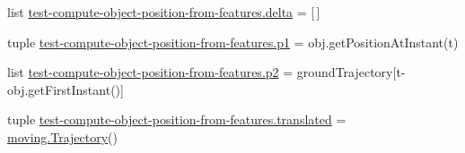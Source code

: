 \begin{DoxyCompactItemize}
\item 
list \hyperlink{namespacetest-compute-object-position-from-features_a9fb99bd15a02836c106926cd0cdb036c}{test-\/compute-\/object-\/position-\/from-\/features.\-delta} = \mbox{[}$\,$\mbox{]}
\item 
tuple \hyperlink{namespacetest-compute-object-position-from-features_a1c5107cbd3fc58e63db55e249d976a61}{test-\/compute-\/object-\/position-\/from-\/features.\-p1} = obj.\-get\-Position\-At\-Instant(t)
\item 
list \hyperlink{namespacetest-compute-object-position-from-features_a762b0d235330d8277506c9bbc52cc900}{test-\/compute-\/object-\/position-\/from-\/features.\-p2} = ground\-Trajectory\mbox{[}t-\/obj.\-get\-First\-Instant()\mbox{]}
\item 
tuple \hyperlink{namespacetest-compute-object-position-from-features_a07c2b413c41f4469dcb2c5e8185db85d}{test-\/compute-\/object-\/position-\/from-\/features.\-translated} = \hyperlink{classmoving_1_1Trajectory}{moving.\-Trajectory}()
\end{DoxyCompactItemize}
